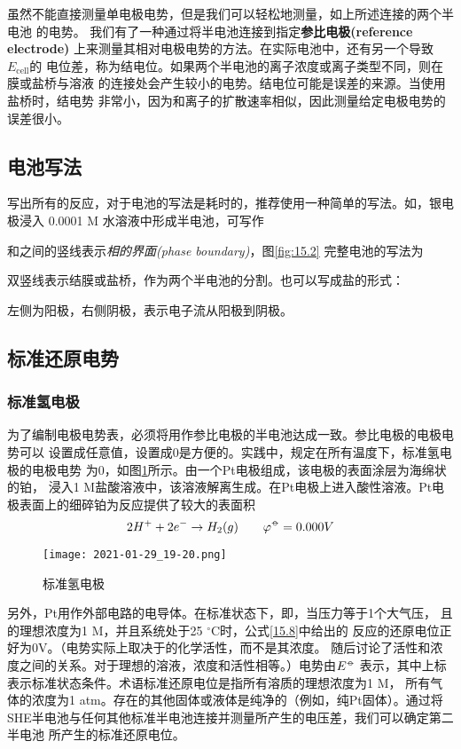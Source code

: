 虽然不能直接测量单电极电势，但是我们可以轻松地测量，如上所述连接的两个半电池
的电势。 我们有了一种通过将半电池连接到指定{\bf 参比电极(reference electrode)}
上来测量其相对电极电势的方法。在实际电池中，还有另一个导致$E_\text{cell}$的
电位差，称为结电位。如果两个半电池的离子浓度或离子类型不同，则在膜或盐桥与溶液
的连接处会产生较小的电势。结电位可能是误差的来源。当使用盐桥时，结电势
非常小，因为和离子的扩散速率相似，因此测量给定电极电势的误差很小。 
\subsection{电池写法}
写出所有的反应，对于电池的写法是耗时的，推荐使用一种简单的写法。如，银电极浸入
0.0001 M 水溶液中形成半电池，可写作
\begin{center}
\end{center}
和之间的竖线表示\emph{相的界面(phase boundary)}，图\ref{fig:15.2}
完整电池的写法为
\begin{center}
\end{center}
双竖线表示结膜或盐桥，作为两个半电池的分割。也可以写成盐的形式：
\begin{center}
\end{center}
左侧为阳极，右侧阴极，表示电子流从阳极到阴极。
\subsection{标准还原电势}
\subsubsection{标准氢电极}
为了编制电极电势表，必须将用作参比电极的半电池达成一致。参比电极的电极电势可以
设置成任意值，设置成0是方便的。实践中，规定在所有温度下，标准氢电极的电极电势
为0，如图\ref{fig:15.4}所示。由一个Pt电极组成，该电极的表面涂层为海绵状的铂，
浸入1 M盐酸溶液中，该溶液解离生成。在Pt电极上进入酸性溶液。Pt电
极表面上的细碎铂为反应提供了较大的表面积
\begin{equation}
    2H^+ + 2e^- \rightarrow H_2(g)\qquad \varphi^\minuso = 0.000 V
    \label{15.8}
\end{equation}
\begin{figure}[htpb]
    \centering
    \texttt{[image: 2021-01-29\_19-20.png]}
    \caption{标准氢电极}
    \label{fig:15.4}
\end{figure}
另外，Pt用作外部电路的电导体。在标准状态下，即，当压力等于1个大气压，
且的理想浓度为1 M，并且系统处于25 $^\circ$C时，公式\ref{15.8}中给出的
反应的还原电位正好为0V。（电势实际上取决于的化学活性，而不是其浓度。
随后讨论了活性和浓度之间的关系。对于理想的溶液，浓度和活性相等。）电势由$E^\minuso$
表示，其中上标表示标准状态条件。术语标准还原电位是指所有溶质的理想浓度为1 M，
所有气体的浓度为1 atm。存在的其他固体或液体是纯净的（例如，纯Pt固体）。通过将
SHE半电池与任何其他标准半电池连接并测量所产生的电压差，我们可以确定第二半电池
所产生的标准还原电位。

